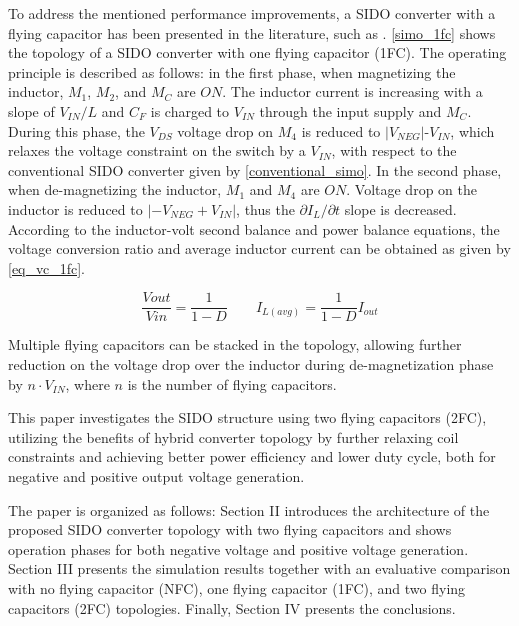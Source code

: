 \documentclass[conference,beamer]{IEEEtran}
\begin{document}
To address the mentioned performance improvements, a SIDO converter with a flying capacitor has been presented in the literature, such as \cite{sibo2,sibo3,sibo5}.
\autoref{simo_1fc} shows the topology of a SIDO converter with one flying capacitor (1FC). The operating principle is described as follows: in the first phase, when magnetizing the inductor, $M_{1}$, $M_{2}$, and $M_{C}$ are $ON$. The inductor current is increasing with a slope of $V_{IN}/L$ and $C_F$ is charged to $V_{IN}$ through the input supply and $M_C$. During this phase, the $V_{DS}$ voltage drop on $M_{4}$ is reduced to $|V_{\mathit{NEG}}|$-$V_{IN}$, which relaxes the voltage constraint on the switch by a $V_{IN}$, with respect to the conventional SIDO converter given by \autoref{conventional_simo}. In the second phase, when de-magnetizing the inductor, $M_{1}$ and $M_{4}$ are $ON$. Voltage drop on the inductor is reduced to $|-V_{NEG}+V_{IN}|$, thus the ${\partial I_L}/{\partial t}$ slope is decreased. According to the inductor-volt second balance and  power balance equations, the voltage conversion ratio and average inductor current can be obtained as given by \autoref{eq_vc_1fc}. 

\begin{equation}
\frac{Vout}{Vin}=\frac{1}{1-D}  \qquad I_{\mathit{L(avg)}}=\frac{1}{1-D}I_{\mathit{out}}
\label{eq_vc_1fc}
\end{equation}

Multiple flying capacitors can be stacked in the topology, allowing further reduction on the voltage drop over the inductor during de-magnetization phase by $n \cdot V_{IN}$, where $n$ is the number of flying capacitors. 

This paper investigates the SIDO structure using two flying capacitors (2FC), utilizing the benefits of hybrid converter topology by further relaxing coil constraints and achieving better power efficiency and lower duty cycle, both for negative and positive output voltage generation.  

The paper is organized as follows: Section II introduces the architecture of the proposed SIDO converter topology with two flying capacitors and shows operation phases for both negative voltage and positive voltage generation. Section III presents the simulation results together with an evaluative comparison with no flying capacitor (NFC), one flying capacitor (1FC), and two flying capacitors (2FC) topologies. Finally, Section IV presents the conclusions. 
\end{document}
